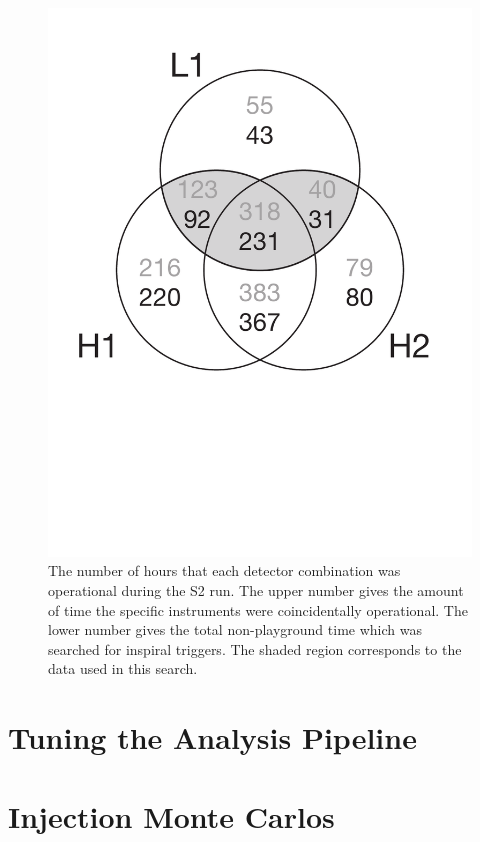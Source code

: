\begin{figure}[H]
\begin{center}
\includegraphics[width=\linewidth]{figures/result/s2_times}
\end{center}
\caption{\label{f:S2times}%
The number of hours that each detector combination was operational during the
S2 run.  The upper number gives the amount of time the specific instruments
were coincidentally operational.  The lower number gives the total
non-playground time which was searched for inspiral triggers.  The shaded
region corresponds to the data used in this search.}
\end{figure}


\section{Tuning the Analysis Pipeline}
\label{s:s2tuning}


\section{Injection Monte Carlos}
\label{s:monte}

